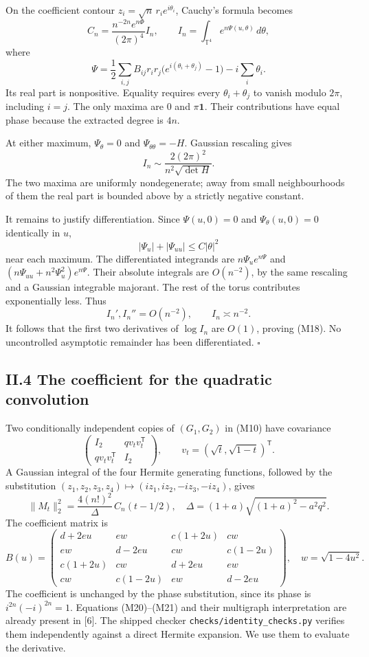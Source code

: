 \documentclass[
  british,
  10pt,
]{article}
\begin{document}
On the coefficient contour \(z_i=\sqrt n\,r_i e^{i\theta_i}\), Cauchy's
formula becomes \[
C_n=\frac{n^{-2n}e^{n\Phi}}{(2\pi)^4}I_n,\qquad
I_n=\int_{\mathbb T^4}e^{n\Psi(u,\theta)}\,d\theta,
\] where \[
\Psi=\frac12\sum_{i,j}B_{ij}r_ir_j
   \bigl(e^{i(\theta_i+\theta_j)}-1\bigr)-i\sum_i\theta_i.
\] Its real part is nonpositive. Equality requires every
\(\theta_i+\theta_j\) to vanish modulo \(2\pi\), including \(i=j\). The
only maxima are \(0\) and \(\pi\mathbf1\). Their contributions have
equal phase because the extracted degree is \(4n\).

At either maximum, \(\Psi_\theta=0\) and \(\Psi_{\theta\theta}=-H\).
Gaussian rescaling gives \[
I_n\sim\frac{2(2\pi)^2}{n^2\sqrt{\det H}}.
\tag{M19}
\] The two maxima are uniformly nondegenerate; away from small
neighbourhoods of them the real part is bounded above by a strictly
negative constant.

It remains to justify differentiation. Since \(\Psi(u,0)=0\) and
\(\Psi_\theta(u,0)=0\) identically in \(u\), \[
|\Psi_u|+|\Psi_{uu}|\le C|\theta|^2
\] near each maximum. The differentiated integrands are
\(n\Psi_u e^{n\Psi}\) and \((n\Psi_{uu}+n^2\Psi_u^2)e^{n\Psi}\). Their
absolute integrals are \(O(n^{-2})\), by the same rescaling and a
Gaussian integrable majorant. The rest of the torus contributes
exponentially less. Thus \[
I_n',I_n''=O(n^{-2}),\qquad I_n\asymp n^{-2}.
\] It follows that the first two derivatives of \(\log I_n\) are
\(O(1)\), proving (M18). No uncontrolled asymptotic remainder has been
differentiated. \(\square\)

\subsection{II.4 The coefficient for the quadratic
convolution}\label{ii.4-the-coefficient-for-the-quadratic-convolution}

Two conditionally independent copies of \((G_1,G_2)\) in (M10) have
covariance \[
\begin{pmatrix}I_2&qv_tv_t^{\mathsf T}\\
qv_tv_t^{\mathsf T}&I_2\end{pmatrix},
\qquad v_t=(\sqrt t,\sqrt{1-t})^{\mathsf T}.
\] A Gaussian integral of the four Hermite generating functions,
followed by the substitution
\((z_1,z_2,z_3,z_4)\mapsto(iz_1,iz_2,-iz_3,-iz_4)\), gives \[
\|M_t\|_2^2=\frac{4(n!)^2}{\Delta}\,C_n(t-1/2),
\quad
\Delta=(1+a)\sqrt{(1+a)^2-a^2q^2}.
\tag{M20}
\] The coefficient matrix is \[
B(u)=
\begin{pmatrix}
d+2eu&ew&c(1+2u)&cw\\
ew&d-2eu&cw&c(1-2u)\\
c(1+2u)&cw&d+2eu&ew\\
cw&c(1-2u)&ew&d-2eu
\end{pmatrix},
\quad w=\sqrt{1-4u^2}.
\tag{M21}
\] The coefficient is unchanged by the phase substitution, since its
phase is \(i^{2n}(-i)^{2n}=1\). Equations (M20)--(M21) and their
multigraph interpretation are already present in {[}6{]}. The shipped
checker \texttt{checks/identity\_checks.py} verifies them independently
against a direct Hermite expansion. We use them to evaluate the
derivative.
\end{document}
